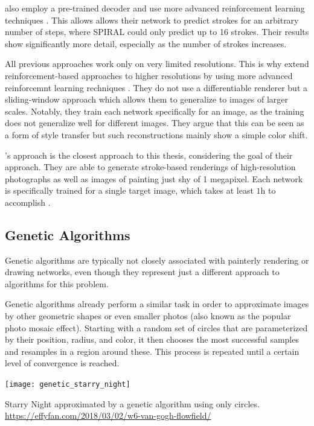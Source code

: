 \citeauthor*{learning2paint} also employ a pre-trained decoder and use more advanced reinforcement learning techniques \cite{learning2paint}.
This allows allows their network to predict strokes for an arbitrary number of steps, where SPIRAL could only predict up to 16 strokes.
Their results show significantly more detail, especially as the number of strokes increases.

All previous approaches work only on very limited resolutions.
This is why \citeauthor*{paintbot} extend reinforcement-based approaches to higher resolutions by using more advanced reinforcemnt learning rechniques \cite{paintbot, LpaintB}.
They do not use a differentiable renderer but a sliding-window approach which allows them to generalize to images of larger scales.
Notably, they train each network specifically for an image, as the training does not generalize well for different images.
They argue that this can be seen as a form of style transfer but such reconstructions mainly show a simple color shift.

\citeauthor*{LpaintB}'s approach is the closest approach to this thesis, considering the goal of their approach.
They are able to generate stroke-based renderings of high-resolution photographs as well as images of painting just shy of 1 megapixel.
Each network is specifically trained for a single target image, which takes at least $1 \si{\hour}$ to accomplish \cite{paintbot}.


\subsection{Genetic Algorithms}
Genetic algorithms are typically not closely associated with painterly rendering or drawing networks, even though they represent just a different approach to algorithms for this problem.

Genetic algorithms already perform a similar task in order to approximate images by other geometric shapes or even smaller photos (also known as the popular photo mosaic effect).
Starting with a random set of circles that are parameterized by their position, radius, and color, it then chooses the most successful samples and resamples in a region around these.
This process is repeated until a certain level of convergence is reached.


\begin{marginfigure}
    \texttt{[image: genetic\_starry\_night]}
    \caption[]{Starry Night approximated by a genetic algorithm using only circles. \url{https://effyfan.com/2018/03/02/w6-van-gogh-flowfield/}}
\end{marginfigure}

